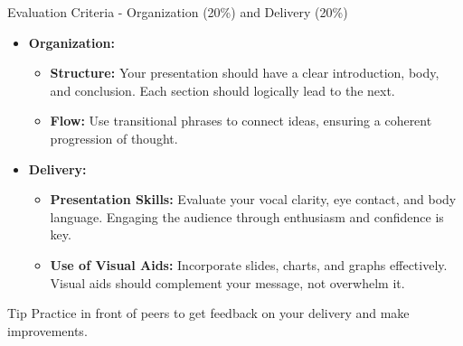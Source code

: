\documentclass[aspectratio=169]{beamer}
\begin{document}
\begin{frame}[fragile]{Evaluation Criteria - Organization (20\%) and Delivery (20\%)}
    \begin{itemize}
        \item \textbf{Organization:}
        \begin{itemize}
            \item \textbf{Structure:} Your presentation should have a clear introduction, body, and conclusion. 
            Each section should logically lead to the next.
            \item \textbf{Flow:} Use transitional phrases to connect ideas, ensuring a coherent progression of thought.
        \end{itemize}
        
        \item \textbf{Delivery:}
        \begin{itemize}
            \item \textbf{Presentation Skills:} Evaluate your vocal clarity, eye contact, and body language. 
            Engaging the audience through enthusiasm and confidence is key.
            \item \textbf{Use of Visual Aids:} Incorporate slides, charts, and graphs effectively. 
            Visual aids should complement your message, not overwhelm it.
        \end{itemize}
    \end{itemize}
    
    \begin{block}{Tip}
        Practice in front of peers to get feedback on your delivery and make improvements.
    \end{block}
\end{frame}
\end{document}
